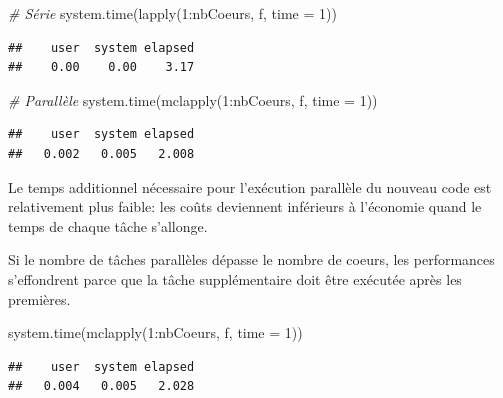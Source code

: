 \documentclass[
  11pt,
  french,
  a4paper,
  extrafontsizes,onecolumn,openright
  ]{memoir}
\newenvironment{Shaded}{\begin{snugshade}}{\end{snugshade}}
\newcommand{\AttributeTok}[1]{\textcolor[rgb]{0.77,0.63,0.00}{#1}}
\newcommand{\CommentTok}[1]{\textcolor[rgb]{0.56,0.35,0.01}{\textit{#1}}}
\newcommand{\DecValTok}[1]{\textcolor[rgb]{0.00,0.00,0.81}{#1}}
\newcommand{\FunctionTok}[1]{\textcolor[rgb]{0.00,0.00,0.00}{#1}}
\newcommand{\NormalTok}[1]{#1}
\newcommand{\SpecialCharTok}[1]{\textcolor[rgb]{0.00,0.00,0.00}{#1}}
\begin{document}
\scriptsize

\begin{Shaded}
\begin{Highlighting}[]
\CommentTok{\# Série}
\FunctionTok{system.time}\NormalTok{(}\FunctionTok{lapply}\NormalTok{(}\DecValTok{1}\SpecialCharTok{:}\NormalTok{nbCoeurs, f, }\AttributeTok{time =} \DecValTok{1}\NormalTok{))}
\end{Highlighting}
\end{Shaded}

\begin{verbatim}
##    user  system elapsed 
##    0.00    0.00    3.17
\end{verbatim}

\begin{Shaded}
\begin{Highlighting}[]
\CommentTok{\# Parallèle}
\FunctionTok{system.time}\NormalTok{(}\FunctionTok{mclapply}\NormalTok{(}\DecValTok{1}\SpecialCharTok{:}\NormalTok{nbCoeurs, f, }\AttributeTok{time =} \DecValTok{1}\NormalTok{))}
\end{Highlighting}
\end{Shaded}

\begin{verbatim}
##    user  system elapsed 
##   0.002   0.005   2.008
\end{verbatim}

\normalsize

Le temps additionnel nécessaire pour l'exécution parallèle du nouveau code est relativement plus faible: les coûts deviennent inférieurs à l'économie quand le temps de chaque tâche s'allonge.

Si le nombre de tâches parallèles dépasse le nombre de coeurs, les performances s'effondrent parce que la tâche supplémentaire doit être exécutée après les premières.

\scriptsize

\begin{Shaded}
\begin{Highlighting}[]
\FunctionTok{system.time}\NormalTok{(}\FunctionTok{mclapply}\NormalTok{(}\DecValTok{1}\SpecialCharTok{:}\NormalTok{nbCoeurs, f, }\AttributeTok{time =} \DecValTok{1}\NormalTok{))}
\end{Highlighting}
\end{Shaded}

\begin{verbatim}
##    user  system elapsed 
##   0.004   0.005   2.028
\end{verbatim}
\end{document}

